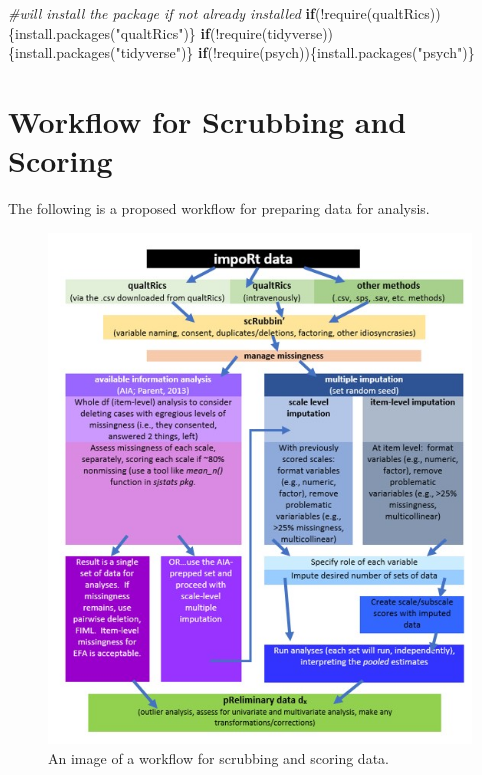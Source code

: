 \documentclass[
  english,
]{book}
\newenvironment{Shaded}{\begin{snugshade}}{\end{snugshade}}
\newcommand{\CommentTok}[1]{\textcolor[rgb]{0.56,0.35,0.01}{\textit{#1}}}
\newcommand{\ControlFlowTok}[1]{\textcolor[rgb]{0.13,0.29,0.53}{\textbf{#1}}}
\newcommand{\FunctionTok}[1]{\textcolor[rgb]{0.00,0.00,0.00}{#1}}
\newcommand{\NormalTok}[1]{#1}
\newcommand{\SpecialCharTok}[1]{\textcolor[rgb]{0.00,0.00,0.00}{#1}}
\newcommand{\StringTok}[1]{\textcolor[rgb]{0.31,0.60,0.02}{#1}}
\begin{document}
\begin{Shaded}
\begin{Highlighting}[]
\CommentTok{\#will install the package if not already installed}
\ControlFlowTok{if}\NormalTok{(}\SpecialCharTok{!}\FunctionTok{require}\NormalTok{(qualtRics))\{}\FunctionTok{install.packages}\NormalTok{(}\StringTok{"qualtRics"}\NormalTok{)\}}
\ControlFlowTok{if}\NormalTok{(}\SpecialCharTok{!}\FunctionTok{require}\NormalTok{(tidyverse))\{}\FunctionTok{install.packages}\NormalTok{(}\StringTok{"tidyverse"}\NormalTok{)\}}
\ControlFlowTok{if}\NormalTok{(}\SpecialCharTok{!}\FunctionTok{require}\NormalTok{(psych))\{}\FunctionTok{install.packages}\NormalTok{(}\StringTok{"psych"}\NormalTok{)\}}
\end{Highlighting}
\end{Shaded}

\hypertarget{workflow-for-scrubbing-and-scoring}{%
\section{Workflow for Scrubbing and Scoring}\label{workflow-for-scrubbing-and-scoring}}

The following is a proposed workflow for preparing data for analysis.

\begin{figure}
\centering
\includegraphics{images/Ch02/scrubscore_wrkflow.jpg}
\caption{An image of a workflow for scrubbing and scoring data.}
\end{figure}
\end{document}

